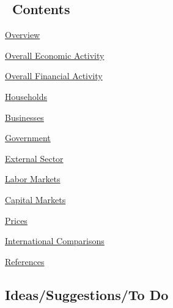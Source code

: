 \documentclass{report}
\begin{document}
\subsection*{\hyperlink{toc}{\faList}\color{black!70} \ {\seriffont Contents}}
\hypertarget{toc}{}
\begin{description}

\item {\hyperref[sec:ov]{Overview}}

\item {\hyperref[sec:oea]{Overall Economic Activity}}

\item {\hyperref[sec:ofa]{Overall Financial Activity}}

\item {\hyperref[sec:hh]{Households}}

\item {\hyperref[sec:bus]{Businesses}}

\item {\hyperref[sec:gov]{Government}}

\item {\hyperref[sec:ext]{External Sector}}

\item {\hyperref[sec:lab]{Labor Markets}}

\item {\hyperref[sec:cap]{Capital Markets}}

\item {\hyperref[sec:pr]{Prices}}

\item {\hyperref[sec:int]{International Comparisons}}

\item {\hyperref[sec:ref]{References}}

\end{description}

\vspace{2mm}

\newpage

\subsection*{\color{black!70} {\seriffont Ideas/Suggestions/To Do}}
\end{document}

